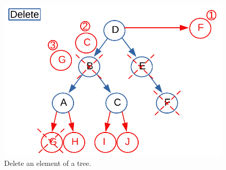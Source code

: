\begin{figure}[H]
	\begin{center}
		\includegraphics[scale=.6]{chapters/trees/images/trees_9.pdf}
		\caption[Delete an element of a tree.]{Delete an element of a tree.}
		\label{trees_9}
	\end{center}
\end{figure}

